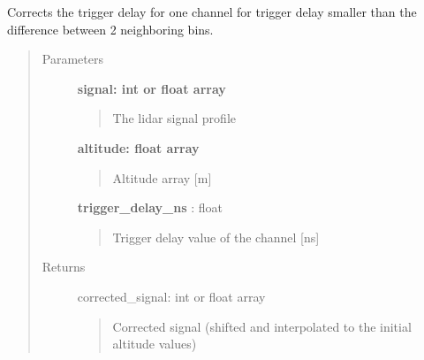 \documentclass[letterpaper,10pt,english]{sphinxmanual}
\begin{document}
\begin{fulllineitems}
\label{pre_processing:pre_processing.correct_trigger_delay_ns}
Corrects the trigger delay for one channel for trigger delay smaller than
the difference between 2 neighboring bins.
\begin{quote}\begin{description}
\item[{Parameters}] \leavevmode
\textbf{signal: int or float array}
\begin{quote}

The lidar signal profile
\end{quote}

\textbf{altitude: float array}
\begin{quote}

Altitude array {[}m{]}
\end{quote}

\textbf{trigger\_delay\_ns} : float
\begin{quote}

Trigger delay value of the channel {[}ns{]}
\end{quote}

\item[{Returns}] \leavevmode
corrected\_signal: int or float array
\begin{quote}

Corrected signal (shifted and interpolated to the initial altitude values)
\end{quote}

\end{description}\end{quote}

\end{fulllineitems}

\end{document}
